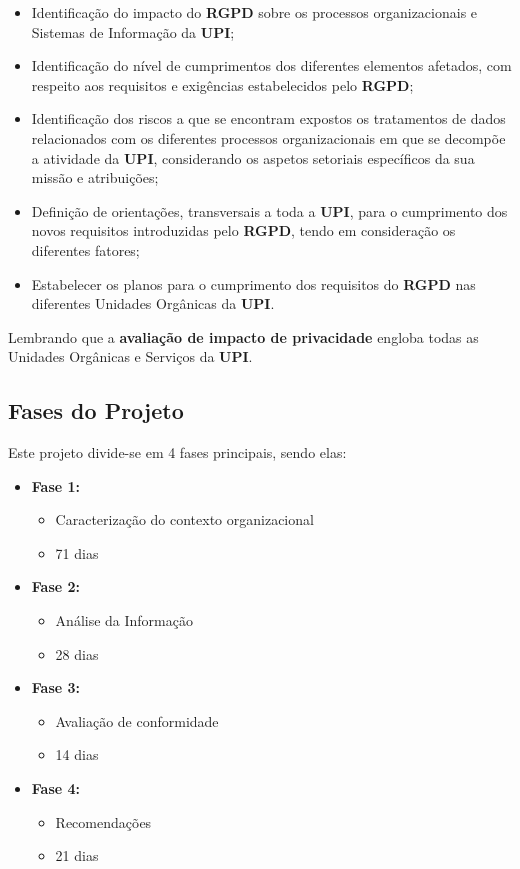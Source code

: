 \begin{itemize}
	\item Identificação do impacto do \textbf{RGPD} sobre os processos organizacionais e Sistemas de Informação da \textbf{UPI};
	\item Identificação do nível de cumprimentos dos diferentes elementos afetados, com respeito aos requisitos e exigências estabelecidos pelo \textbf{RGPD};
	\item Identificação dos riscos a que se encontram expostos os tratamentos de dados relacionados com os diferentes processos organizacionais em que se decompõe a atividade da \textbf{UPI}, considerando os aspetos setoriais específicos da sua missão e atribuições;
	\item Definição de orientações, transversais a toda a \textbf{UPI}, para o cumprimento dos novos requisitos introduzidas pelo \textbf{RGPD}, tendo em consideração os diferentes fatores;
	\item Estabelecer os planos para o cumprimento dos requisitos do \textbf{RGPD} nas diferentes Unidades Orgânicas da \textbf{UPI}.
\end{itemize}

Lembrando que a \textbf{avaliação de impacto de privacidade} engloba todas as Unidades Orgânicas e Serviços da \textbf{UPI}.


\subsection{Fases do Projeto}

Este projeto divide-se em 4 fases principais, sendo elas:


\begin{itemize}
	\item \textbf{Fase 1:} 
		\begin{itemize}
			\item Caracterização do contexto organizacional
			\item 71 dias
		\end{itemize}
	\item \textbf{Fase 2:}
		\begin{itemize}
			\item Análise da Informação
			\item 28 dias
		\end{itemize}
	\item \textbf{Fase 3:}
		\begin{itemize}
			\item Avaliação de conformidade
			\item 14 dias
		\end{itemize}
	\item \textbf{Fase 4:}
		\begin{itemize}
			\item Recomendações
			\item 21 dias
		\end{itemize}
\end{itemize}